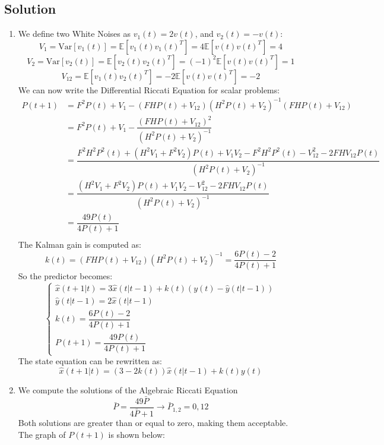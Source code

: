 \subsection*{Solution}
\begin{enumerate}
    \item We define two White Noises as $v_1(t)=2v(t)$, and $v_2(t)=-v(t)$: 
        \[V_1=\text{Var}\left[v_1(t)\right]=\mathbb{E}\left[v_1(t)v_1(t)^T\right]=4\mathbb{E}\left[v(t)v(t)^T\right]=4\]
        \[V_2=\text{Var}\left[v_2(t)\right]=\mathbb{E}\left[v_2(t)v_2(t)^T\right]=(-1)^2\mathbb{E}\left[v(t)v(t)^T\right]=1\]
        \[V_{12}=\mathbb{E}\left[v_1(t)v_2(t)^T\right]=-2\mathbb{E}\left[v(t)v(t)^T\right]=-2\]
        We can now write the Differential Riccati Equation for scalar problems:
        \begin{align*}
            P(t+1)  &=F^2P(t)+V_1-(FHP(t)+V_{12})(H^2P(t)+V_2)^{-1}(FHP(t)+V_{12}) \\
                    &=F^2P(t)+V_1-\dfrac{(FHP(t)+V_{12})^2}{(H^2P(t)+V_2)^{-1}} \\
                    &=\dfrac{F^2H^2P^2(t)+(H^2V_1+F^2V_2)P(t)+V_1V_2-F^2H^2P^2(t)-V_{12}^2-2FHV_{12}P(t)}{(H^2P(t)+V_2)^{-1}} \\
                    &=\dfrac{(H^2V_1+F^2V_2)P(t)+V_1V_2-V_{12}^2-2FHV_{12}P(t)}{(H^2P(t)+V_2)^{-1}} \\
                    &=\dfrac{49P(t)}{4P(t)+1} \\
        \end{align*}
        The Kalman gain is computed as:
        \[k(t)=\left(FHP(t)+V_{12}\right)\left(H^2P(t)+V_2\right)^{-1}=\dfrac{6P(t)-2}{4P(t)+1}\]
        So the predictor becomes:
        \[\begin{cases}
            \hat{x}(t+1|t)=3\hat{x}(t|t-1)+k(t)\left(y(t)-\hat{y}(t|t-1)\right) \\ 
            \hat{y}(t|t-1)=2\hat{x}(t|t-1) \\
            k(t)=\dfrac{6P(t)-2}{4P(t)+1} \\
            P(t+1)=\dfrac{49P(t)}{4P(t)+1}
        \end{cases}\]
        The state equation can be rewritten as:
        \[\hat{x}(t+1|t)=(3-2k(t))\hat{x}(t|t-1)+k(t)y(t)\]
    \item We compute the solutions of the Algebraic Riccati Equation
        \[\bar{P}=\dfrac{49\bar{P}}{4\bar{P}+1}\rightarrow\bar{P}_{1,2}=0,12\]
        Both solutions are greater than or equal to zero, making them acceptable. 
        The graph of $P(t+1)$ is shown below:

\end{enumerate}
